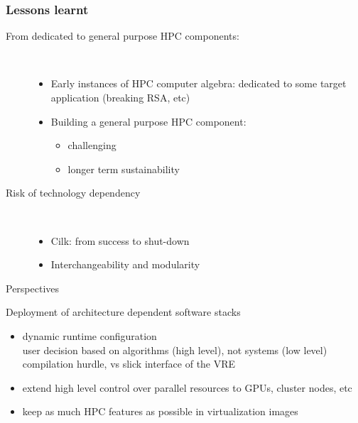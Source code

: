 \documentclass{beamer}
\newcommand{\thus}{\textcolor{red}{\MVRightarrow{}}\xspace}
\begin{document}
\begin{frame}
  \frametitle{Lessons learnt}

  \begin{description}
    \item[From dedicated to general purpose HPC components:]\
      \begin{itemize}
      \item  Early instances of HPC computer algebra: dedicated to some target
        application (breaking RSA, etc)
      \item Building a general purpose HPC component:
        \begin{itemize}
        \item challenging
        \item longer term sustainability
        \end{itemize}
      \end{itemize}
    \item[Risk of technology dependency]\
      \begin{itemize}
      \item Cilk: from success to shut-down
      \item Interchangeability and modularity
      \end{itemize}
      \end{description}
  \end{frame}
\begin{frame} {Perspectives}

  \begin{block}{ Deployment of architecture dependent software stacks}
    \begin{itemize}
    \item dynamic runtime configuration\\
      \thus user decision based on algorithms (high level), not systems (low level)
      \thus compilation hurdle, vs slick interface of the VRE 
    \item extend high level control over parallel resources to GPUs, cluster nodes, etc

    \item keep as much HPC features as possible in  virtualization images
    \end{itemize}
  \end{block}
\end{frame}

\end{document}
